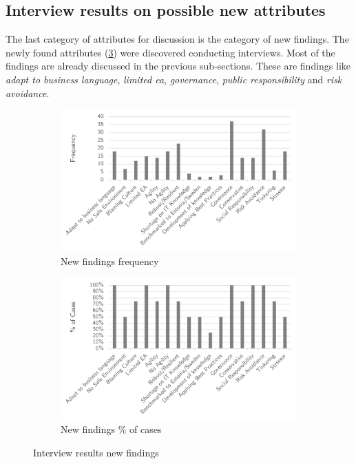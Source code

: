 \subsection{Interview results on possible new attributes}
\label{sub:interviewresultsnewattributes}
The last category of \glspl{attribute} for discussion is the category of new findings. The newly found \glspl{attribute} \mbox{(\cref{fig:interviewresultsfindings})} were discovered conducting interviews. Most of the findings are already discussed in the previous sub-sections. These are findings like \textit{adapt to business language}, \textit{limited \gls{ea}}, \textit{governance}, \textit{public responsibility} and \textit{risk avoidance}. 
\begin{figure}[H]
	\centering
	\begin{subfigure}[H]{0.5\textwidth}
		\centering
		\includegraphics[width=0.95\linewidth]{images/findings_frequency}
		\caption{New findings frequency}
		\label{fig:findingsfrequency}
	\end{subfigure}%
	\begin{subfigure}[H]{0.5\textwidth}
		\centering
		\includegraphics[width=0.95\linewidth]{images/findings_cases}
		\caption{New findings \% of cases}
		\label{fig:findingscases}
	\end{subfigure}
	\caption{Interview results new findings}
	\label{fig:interviewresultsfindings}
\end{figure}
